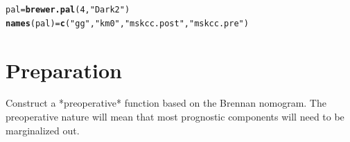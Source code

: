 \documentclass{article}\usepackage[]{graphicx}\usepackage[]{color}
\makeatletter
\newcommand{\hlnum}[1]{\textcolor[rgb]{0.686,0.059,0.569}{#1}}%
\newcommand{\hlstr}[1]{\textcolor[rgb]{0.192,0.494,0.8}{#1}}%
\newcommand{\hlstd}[1]{\textcolor[rgb]{0.345,0.345,0.345}{#1}}%
\newcommand{\hlkwb}[1]{\textcolor[rgb]{0.69,0.353,0.396}{#1}}%
\newcommand{\hlkwd}[1]{\textcolor[rgb]{0.737,0.353,0.396}{\textbf{#1}}}%
\newenvironment{kframe}{%
 \def\at@end@of@kframe{}%
 \ifinner\ifhmode%
  \def\at@end@of@kframe{\end{minipage}}%
  \begin{minipage}{\columnwidth}%
 \fi\fi%
 \def\FrameCommand##1{\hskip\@totalleftmargin \hskip-\fboxsep
 \colorbox{shadecolor}{##1}\hskip-\fboxsep
     \hskip-\linewidth \hskip-\@totalleftmargin \hskip\columnwidth}%
 \MakeFramed {\advance\hsize-\width
   \@totalleftmargin\z@ \linewidth\hsize
   \@setminipage}}%
 {\par\unskip\endMakeFramed%
 \at@end@of@kframe}
\newenvironment{knitrout}{}{} %
\makeatother
\begin{document}
\begin{knitrout}
\color{fgcolor}\begin{kframe}
\begin{alltt}
\hlstd{pal} \hlkwb{=} \hlkwd{brewer.pal}\hlstd{(}\hlnum{4}\hlstd{,} \hlstr{"Dark2"}\hlstd{)}
\hlkwd{names}\hlstd{(pal)} \hlkwb{=} \hlkwd{c}\hlstd{(}\hlstr{"gg"}\hlstd{,} \hlstr{"km0"}\hlstd{,} \hlstr{"mskcc.post"}\hlstd{,} \hlstr{"mskcc.pre"}\hlstd{)}
\end{alltt}
\end{kframe}
\end{knitrout}


\section{Preparation}
Construct a *preoperative* function based on the Brennan nomogram.  The preoperative nature will mean that most prognostic components will need to be marginalized out.
\end{document}
